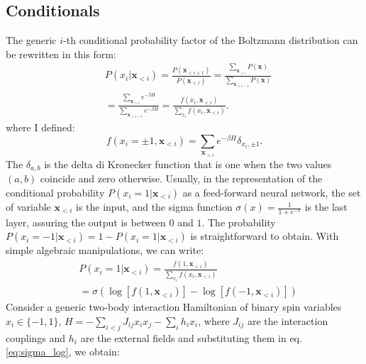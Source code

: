 \documentclass[aps,physrev,10pt,floatfix,reprint]{revtex4-2}
\begin{document}
\subsection{Conditionals}
The generic $i$-th conditional probability factor of the Boltzmann distribution can be rewritten in this form: 
\begin{equation}
    \label{eq:chain}
    \begin{split}
    & P\left(x_{i}|\mathbf{x}_{<i}\right)  = 
    \frac{P\left(\mathbf{x}_{<i+1}\right)}{P\left(\mathbf{x}_{<i}\right)}  = 
    \frac{\sum_{\mathbf{x}_{>i}}P\left(\mathbf{x}\right)}{\sum_{\mathbf{x}_{>i-1}}P\left(\mathbf{x}\right)} \\
    &=\frac{\sum_{\mathbf{x}_{>i}}e^{-\beta H}}{\sum_{\mathbf{x}_{>i-1}}e^{-\beta H}}  = 
    \frac{f\left(x_{i},\mathbf{x}_{<i}\right)}{\sum_{x_{i}}f\left(x_{i},\mathbf{x}_{<i}\right)}.
    \end{split}
\end{equation}
where I defined: 
\begin{equation}
f\left(x_{i}=\pm 1,\mathbf{x}_{<i}\right) = \sum_{\mathbf{x}_{>i}}e^{-\beta H}\delta_{x_i, \pm1}.  
\end{equation}
The $\delta_{a,b}$ is the delta di Kronecker function that is one when the two values $(a,b)$ coincide and zero otherwise. Usually, in the representation of the conditional probability $P\left(x_{i}=1|\mathbf{x}_{<i}\right)$ as a feed-forward neural network, the set of variable $\mathbf{x}_{<i}$ is the input, and the sigma function $\sigma(x)=\frac{1}{1+e^{-x}}$ is the last layer, assuring the output is between $0$ and $1$. The probability $P\left(x_{i}=-1|\mathbf{x}_{<i}\right) = 1 - P\left(x_{i}=1|\mathbf{x}_{<i}\right)$ is straightforward to obtain. With simple algebraic manipulations, we can write: 
\begin{equation}
    \label{eq:sigma_log}
    \begin{split}
    & P\left(x_{i}=1|\mathbf{x}_{<i}\right) = \frac{f\left(1,\mathbf{x}_{<i}\right)}{\sum_{x_{i}}f\left(x_{i},\mathbf{x}_{<i}\right)}\\
    &= \sigma\left(\log\left[f\left(1,\mathbf{x}_{<i}\right)\right]-\log\left[f\left(-1,\mathbf{x}_{<i}\right)\right]\right)
    \end{split}
\end{equation}
Consider a generic two-body interaction Hamiltonian of binary spin variables $x_i \in \{-1,1\}$, $H = -\sum_{i<j} J_{ij} x_i x_j - \sum_{i} h_i x_i$, where $J_{ij}$ are the interaction couplings and $h_i$ are the external fields and substituting them in eq.\ref{eq:sigma_log}, we obtain:
\end{document}
